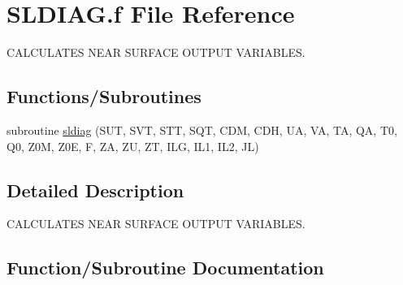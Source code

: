 \hypertarget{SLDIAG_8f}{}\section{S\+L\+D\+I\+A\+G.\+f File Reference}
\label{SLDIAG_8f}


C\+A\+L\+C\+U\+L\+A\+T\+E\+S N\+E\+A\+R S\+U\+R\+F\+A\+C\+E O\+U\+T\+P\+U\+T V\+A\+R\+I\+A\+B\+L\+E\+S.  


\subsection*{Functions/\+Subroutines}
\begin{DoxyCompactItemize}
\item 
subroutine \hyperlink{SLDIAG_8f_ad70c758db99cc5fdf4cabbcd33447dd2}{sldiag} (S\+U\+T, S\+V\+T, S\+T\+T, S\+Q\+T, C\+D\+M, C\+D\+H, U\+A, V\+A, T\+A, Q\+A, T0, Q0, Z0\+M, Z0\+E, F, Z\+A, Z\+U, Z\+T, I\+L\+G, I\+L1, I\+L2, J\+L)
\end{DoxyCompactItemize}


\subsection{Detailed Description}
C\+A\+L\+C\+U\+L\+A\+T\+E\+S N\+E\+A\+R S\+U\+R\+F\+A\+C\+E O\+U\+T\+P\+U\+T V\+A\+R\+I\+A\+B\+L\+E\+S. 



\subsection{Function/\+Subroutine Documentation}
\hypertarget{SLDIAG_8f_ad70c758db99cc5fdf4cabbcd33447dd2}{}
